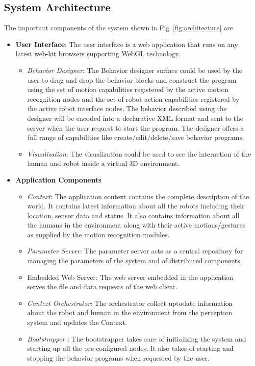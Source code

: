 \documentclass{llncs}
\begin{document}
\subsection{System Architecture}
%
The important components of the system shown in Fig~\ref{fig:architecture} are
\begin{itemize}
\item \textbf{User Interface}: The user interface is a web application that runs on any latest web-kit browsers supporting WebGL technology. 
\begin{itemize}
\item \emph{Behavior Designer}: The Behavior designer surface could be used by the user to drag and drop the behavior blocks and construct the program using the set of motion capabilities registered by the active motion recognition nodes and the set of robot action capabilities registered by the active robot interface nodes. The behavior described using the designer will be encoded into a declarative XML format and sent to the server when the user request to start the program. The designer offers a full range of capabilities like create/edit/delete/save behavior programs.
\item \emph{Visualization}: The visualization could be used to see the interaction of the human and robot inside a virtual 3D environment.
\end{itemize}
\item \textbf{Application Components}
\begin{itemize}
\item \emph{Context}: The application context contains the complete description of the world. It contains latest information about all the robots including their location, sensor data and status. It also contains information about all the humans in the environment along with their active motions/gestures as supplied by the motion recognition modules.
\item \emph{Parameter Server}: The parameter server acts as a central repository for managing the parameters of the system and of distributed components.
\item Embedded Web Server: The web server embedded in the application serves the file and data requests of the web client.
\item \emph{Context Orchestrator}: The orchestrator collect uptodate information about the robot and human in the environment from the perception system and updates the Context.
\item \emph{Bootstrapper} : The bootstrapper takes care of initializing the system and starting up all the pre-configured nodes. It also takes of starting and stopping the behavior programs when requested by the user. 

\end{itemize}
\end{itemize}
\end{document}

